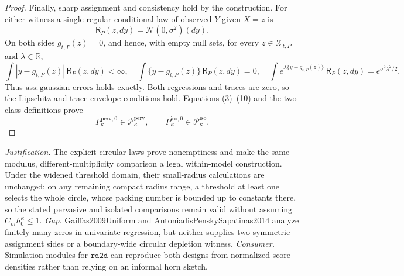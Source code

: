 \documentclass{article}
\begin{document}
\begin{proof}
Finally, sharp assignment and consistency hold by the construction.  For
either witness a single regular conditional law of observed \(Y\) given
\(X=z\) is
\[
 \mathsf R_P(z,dy)=\mathcal N(0,\sigma^2)(dy).
\]
On both sides \(g_{t,P}(z)=0\), and hence, with empty null sets, for every
\(z\in\mathcal X_{t,P}\) and \(\lambda\in\mathbb R\),
\[
 \int |y-g_{t,P}(z)|\,\mathsf R_P(z,dy)<\infty,
 \quad
 \int\{y-g_{t,P}(z)\}\,\mathsf R_P(z,dy)=0,
 \quad
 \int e^{\lambda\{y-g_{t,P}(z)\}}\,\mathsf R_P(z,dy)
 =e^{\sigma^2\lambda^2/2}.
 \tag{10}
\]
Thus \(\mathrm{ass:gaussian\text{-}errors}\) holds exactly.  Both
regressions and traces are zero, so the Lipschitz and trace-envelope
conditions hold.  Equations (3)--(10) and the two class definitions prove
\[
 P_{\kappa}^{\mathrm{perv},0}\in\mathcal P_{\kappa}^{\mathrm{perv}},
 \qquad
 P_{\kappa}^{\mathrm{iso},0}\in\mathcal P_{\kappa}^{\mathrm{iso}}.
\]
\end{proof}
\par\smallskip\noindent \textit{Justification.} The explicit circular laws prove nonemptiness and make the same-modulus, different-multiplicity comparison a legal within-model construction. Under the widened threshold domain, their small-radius calculations are unchanged; on any remaining compact radius range, a threshold at least one selects the whole circle, whose packing number is bounded up to constants there, so the stated pervasive and isolated comparisons remain valid without assuming \(C_mh_0^{\kappa}\le1\). \textit{Gap.} Gaiffas2009Uniform and AntoniadisPenskySapatinas2014 analyze finitely many zeros in univariate regression, but neither supplies two symmetric assignment sides or a boundary-wide circular depletion witness. \textit{Consumer.} Simulation modules for \(\texttt{rd2d}\) can reproduce both designs from normalized score densities rather than relying on an informal horn sketch.
\end{document}
